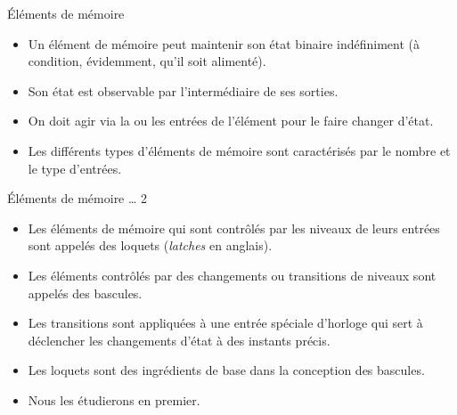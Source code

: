\documentclass[presentation]{beamer}
\begin{document}
\begin{frame}[label={sec:org795c356}]{Éléments de mémoire}
\begin{itemize}
\item Un élément de mémoire peut maintenir son état binaire indéfiniment (à condition, évidemment, qu'il soit alimenté).

\item Son état est observable par l'intermédiaire de ses sorties.

\item On doit agir via la ou les entrées de l'élément pour le faire changer d'état.

\item Les différents types d'éléments de mémoire sont caractérisés par le nombre et le type d'entrées.
\end{itemize}
\end{frame}

\begin{frame}[label={sec:org6497c6a}]{Éléments de mémoire \ldots{} 2}
\begin{itemize}
\item Les éléments de mémoire qui sont contrôlés par les niveaux de leurs entrées sont appelés des \alert{loquets} (\emph{latches} en anglais).

\item Les éléments contrôlés par des changements ou \alert{transitions} de niveaux sont appelés des bascules.

\item Les transitions sont appliquées à une entrée spéciale d'horloge qui sert à déclencher les changements d'état à des instants précis.

\item Les loquets sont des ingrédients de base dans la conception des bascules.

\item Nous les étudierons en premier.
\end{itemize}
\end{frame}
\end{document}

